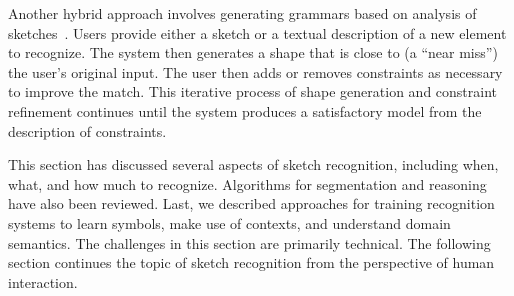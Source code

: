 Another hybrid approach involves generating grammars based on analysis
of
sketches~\cite{veselova-perceptual,hammond-interactive-descriptions}. Users
provide either a sketch or a textual description of a new element to
recognize. The system then generates a shape that is close to (a
``near miss'') the user's original input. The user then adds or
removes constraints as necessary to improve the match. This iterative
process of shape generation and constraint refinement continues until
the system produces a satisfactory model from the description of
constraints.

\vspace{12pt}

This section has discussed several aspects of sketch
recognition, including when, what, and how much to
recognize. Algorithms for segmentation and reasoning have also been
reviewed. Last, we described approaches for training recognition
systems to learn symbols, make use of contexts, and understand domain
semantics. The challenges in this section are primarily technical. The
following section continues the topic of sketch recognition from the
perspective of human interaction.
